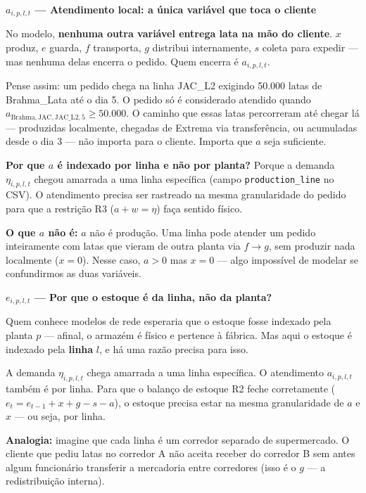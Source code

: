\documentclass[12pt, a4paper]{article}
\begin{document}
\vspace{6pt}
\begin{mdframed}[style=destaque]
\textbf{\color{ballblue}$a_{i,p,l,t}$ --- Atendimento local: a \'{u}nica vari\'{a}vel que toca o cliente}

\medskip
No modelo, \textbf{nenhuma outra vari\'{a}vel entrega lata na m\~{a}o do cliente}.
$x$ produz, $e$ guarda, $f$ transporta, $g$ distribui internamente, $s$ coleta para expedir ---
mas nenhuma delas encerra o pedido. Quem encerra \'{e} $a_{i,p,l,t}$.

\medskip
Pense assim: um pedido chega na linha JAC\_L2 exigindo 50.000 latas de Brahma\_Lata at\'{e}
o dia 5. O pedido s\'{o} \'{e} considerado atendido quando $a_{\text{Brahma},\text{JAC},\text{JAC\_L2},5}
\geq 50.000$. O caminho que essas latas percorreram at\'{e} chegar l\'{a} --- produzidas
localmente, chegadas de Extrema via transfer\^{e}ncia, ou acumuladas desde o dia 3 ---
n\~{a}o importa para o cliente. Importa que $a$ seja suficiente.

\medskip
\textbf{Por que $a$ \'{e} indexado por linha e n\~{a}o por planta?}
Porque a demanda $\eta_{i,p,l,t}$ chegou amarrada a uma linha espec\'{i}fica
(campo \texttt{production\_line} no CSV). O atendimento precisa ser rastreado
na mesma granularidade do pedido para que a restri\c{c}\~{a}o R3 ($a + w = \eta$)
fa\c{c}a sentido f\'{i}sico.

\medskip
\textbf{O que $a$ n\~{a}o \'{e}:} $a$ n\~{a}o \'{e} produ\c{c}\~{a}o. Uma linha pode atender
um pedido inteiramente com latas que vieram de outra planta via $f \to g$,
sem produzir nada localmente ($x = 0$). Nesse caso, $a > 0$ mas $x = 0$ --- algo
imposs\'{i}vel de modelar se confundirmos as duas vari\'{a}veis.
\end{mdframed}

\vspace{8pt}
\begin{mdframed}[style=destaque]
\textbf{\color{ballblue}$e_{i,p,l,t}$ --- Por que o estoque \'{e} da \textbf{linha}, n\~{a}o da planta?}

\medskip
Quem conhece modelos de rede esperaria que o estoque fosse indexado pela planta $p$
--- afinal, o armazém \'{e} f\'{i}sico e pertence \`{a} f\'{a}brica. Mas aqui o estoque
\'{e} indexado pela \textbf{linha} $l$, e h\'{a} uma raz\~{a}o precisa para isso.

\medskip
A demanda $\eta_{i,p,l,t}$ chega amarrada a uma linha espec\'{i}fica. O atendimento
$a_{i,p,l,t}$ tamb\'{e}m \'{e} por linha. Para que o balan\c{c}o de estoque R2 feche
corretamente ($e_{t} = e_{t-1} + x + g - s - a$), o estoque precisa estar
na mesma granularidade de $a$ e $x$ --- ou seja, por linha.

\medskip
\textbf{Analogia:} imagine que cada linha \'{e} um corredor separado de supermercado.
O cliente que pediu latas no corredor A n\~{a}o aceita receber do corredor B sem
antes algum funcion\'{a}rio transferir a mercadoria entre corredores
(isso \'{e} o $g$ --- a redistribui\c{c}\~{a}o interna).
\end{mdframed}
\end{document}
